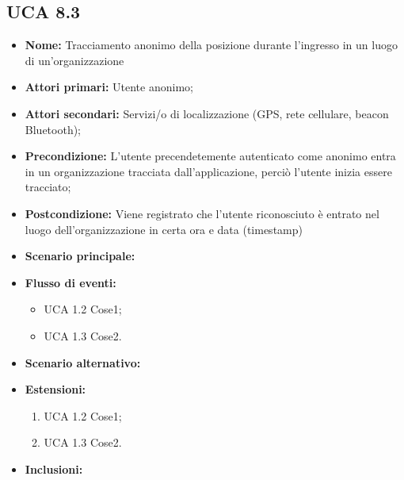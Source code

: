 \subsection{UCA 8.3}%
\begin{itemize}
	\item \textbf{Nome:} Tracciamento anonimo della posizione durante l'ingresso in un luogo di un'organizzazione
	\item \textbf{Attori primari:} Utente anonimo; 
	\item \textbf{Attori secondari:} Servizi/o di localizzazione (GPS, rete cellulare, beacon Bluetooth);
	\item \textbf{Precondizione:} L'utente precendetemente autenticato come anonimo entra in un organizzazione tracciata dall'applicazione, perciò l'utente inizia essere tracciato;
	\item \textbf{Postcondizione:} Viene registrato che l'utente riconosciuto è entrato nel luogo dell'organizzazione in certa ora e data (timestamp)
	\item \textbf{Scenario principale:}
	\item \textbf{Flusso di eventi:} 
	\begin{itemize}
		\item UCA 1.2 Cose1;
		\item UCA 1.3 Cose2.
	\end{itemize}
	\item \textbf{Scenario alternativo:}
	\item \textbf{Estensioni:}
	\begin{enumerate}
		\item UCA 1.2 Cose1;
		\item UCA 1.3 Cose2.
	\end{enumerate}
	\item \textbf{Inclusioni:}
\end{itemize}

